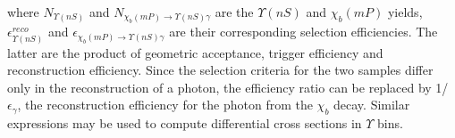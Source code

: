 \noindent where
${N_{\Upsilon(nS)}}$ and ${N_{\chi_b(mP)\to \Upsilon(nS) \gamma}}$ are the
$\Upsilon(nS)$ and $\chi_b(mP)$ yields, $\epsilon_{\Upsilon(nS)}^{reco}$ and
$\epsilon_{\chi_b(mP)\to \Upsilon(nS) \gamma}$ are their corresponding selection
efficiencies. The latter are the product of geometric acceptance, trigger
efficiency and reconstruction efficiency. Since the selection criteria for the
two samples differ only in the reconstruction of a photon, the efficiency ratio
can be replaced by 1/$\epsilon_{\gamma}$, the reconstruction efficiency for the
photon from the $\chi_b$ decay. Similar expressions may be used to compute
differential cross sections in $\Upsilon$ \pt bins.